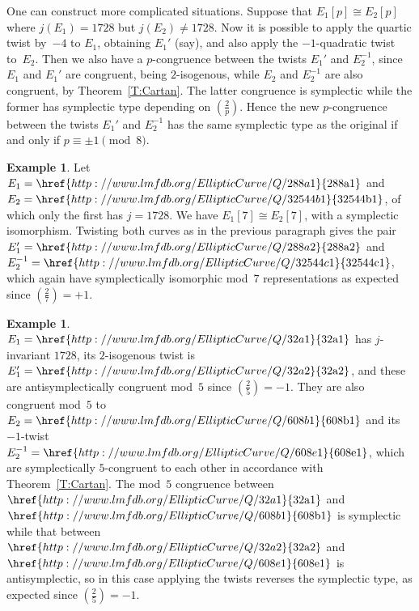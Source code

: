 \documentclass[12pt, reqno]{amsart}
\newcommand{\lmfdbec}[3]{\href{http://www.lmfdb.org/EllipticCurve/Q/#1#2#3}{{\text{\rm#1#2#3}}}}
\newcommand{\rhobar}{{\overline{\rho}}}
\def\legendre#1#2{\left(\displaystyle\frac{#1}{#2}\right)}
\numberwithin{equation}{section}
\theoremstyle{definition}
\newtheorem{example}[theorem]{Example}
\theoremstyle{remark}
\begin{document}


One can construct more complicated situations.  Suppose that
$E_1[p]\cong E_2[p]$ where $j(E_1)=1728$ but $j(E_2)\not=1728$.  Now
it is possible to apply the quartic twist by~$-4$ to $E_1$, obtaining
$E_1'$ (say), and also apply the $-1$-quadratic twist to~$E_2$.  Then
we also have a $p$-congruence between the twists $E_1'$ and
$E_2^{-1}$, since $E_1$ and $E_1'$ are congruent, being $2$-isogenous,
while $E_2$ and $E_2^{-1}$ are also congruent, by
Theorem~\ref{T:Cartan}.  The latter congruence is symplectic while the
former has symplectic type depending on $\legendre{2}{p}$.  Hence the
new $p$-congruence between the twists $E_1'$ and $E_2^{-1}$ has the
same symplectic type as the original if and only if
$p\equiv\pm1\pmod8$.

\begin{example}
Let $E_1=\lmfdbec{288}{a}{1}$ and $E_2=\lmfdbec{32544}{b}{1}$, of
which only the first has $j=1728$.  We have $E_1[7]\cong E_2[7]$, with
a symplectic isomorphism.  Twisting both curves as in the previous
paragraph gives the pair $E_1'=\lmfdbec{288}{a}{2}$ and
$E_2^{-1}=\lmfdbec{32544}{c}{1}$, which again have symplectically
isomorphic mod~$7$ representations as expected since
$\legendre{2}{7}=+1$.
\end{example}

\begin{example}
  $E_1=\lmfdbec{32}{a}{1}$ has $j$-invariant $1728$, its $2$-isogenous
  twist is $E_1'=\lmfdbec{32}{a}{2}$, and these are antisymplectically
  congruent mod~$5$ since $\legendre{2}{5}=-1$.  They are also
  congruent mod~$5$ to $E_2=\lmfdbec{608}{b}{1}$ and its $-1$-twist
  $E_2^{-1}=\lmfdbec{608}{e}{1}$, which are symplectically
  $5$-congruent to each other in accordance with
  Theorem~\ref{T:Cartan}.  The mod~$5$ congruence between
  $\lmfdbec{32}{a}{1}$ and $\lmfdbec{608}{b}{1}$ is symplectic while
  that between $\lmfdbec{32}{a}{2}$ and $\lmfdbec{608}{e}{1}$ is
  antisymplectic, so in this case applying the twists reverses the
  symplectic type, as expected since $\legendre{2}{5}=-1$.
\end{example}
\end{document}

